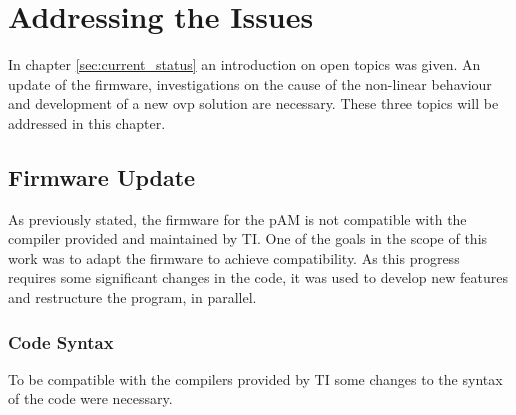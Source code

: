\chapter{Addressing the Issues}
\label{sec:problem_solving}
In chapter \ref{sec:current_status} an introduction on open topics was given. An update of the firmware, investigations on the cause of the non-linear behaviour and development of a new \ac{ovp} solution are necessary. These three topics will be addressed in this chapter.

\section{Firmware Update}
\label{sec:newfirmware}
As previously stated, the firmware for the \ac{pAM} is not compatible with the compiler provided and maintained by \ac{TI}. One of the goals in the scope of this work was to adapt the firmware to achieve compatibility. As this progress requires some significant changes in the code, it was used to develop new features and restructure the program, in parallel.
\subsection{Code Syntax}
To be compatible with the compilers provided by TI some changes to the syntax of the code were necessary.

